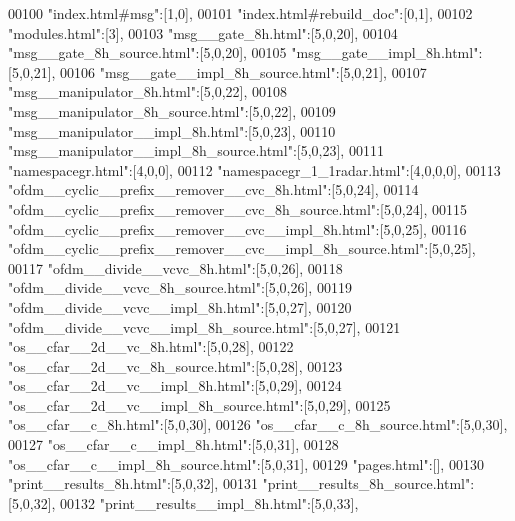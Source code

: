 \begin{DoxyCode}
00100 \textcolor{stringliteral}{"index.html#msg"}:[1,0],
00101 \textcolor{stringliteral}{"index.html#rebuild\_doc"}:[0,1],
00102 \textcolor{stringliteral}{"modules.html"}:[3],
00103 \textcolor{stringliteral}{"msg\_\_gate\_8h.html"}:[5,0,20],
00104 \textcolor{stringliteral}{"msg\_\_gate\_8h\_source.html"}:[5,0,20],
00105 \textcolor{stringliteral}{"msg\_\_gate\_\_impl\_8h.html"}:[5,0,21],
00106 \textcolor{stringliteral}{"msg\_\_gate\_\_impl\_8h\_source.html"}:[5,0,21],
00107 \textcolor{stringliteral}{"msg\_\_manipulator\_8h.html"}:[5,0,22],
00108 \textcolor{stringliteral}{"msg\_\_manipulator\_8h\_source.html"}:[5,0,22],
00109 \textcolor{stringliteral}{"msg\_\_manipulator\_\_impl\_8h.html"}:[5,0,23],
00110 \textcolor{stringliteral}{"msg\_\_manipulator\_\_impl\_8h\_source.html"}:[5,0,23],
00111 \textcolor{stringliteral}{"namespacegr.html"}:[4,0,0],
00112 \textcolor{stringliteral}{"namespacegr\_1\_1radar.html"}:[4,0,0,0],
00113 \textcolor{stringliteral}{"ofdm\_\_cyclic\_\_prefix\_\_remover\_\_cvc\_8h.html"}:[5,0,24],
00114 \textcolor{stringliteral}{"ofdm\_\_cyclic\_\_prefix\_\_remover\_\_cvc\_8h\_source.html"}:[5,0,24],
00115 \textcolor{stringliteral}{"ofdm\_\_cyclic\_\_prefix\_\_remover\_\_cvc\_\_impl\_8h.html"}:[5,0,25],
00116 \textcolor{stringliteral}{"ofdm\_\_cyclic\_\_prefix\_\_remover\_\_cvc\_\_impl\_8h\_source.html"}:[5,0,25],
00117 \textcolor{stringliteral}{"ofdm\_\_divide\_\_vcvc\_8h.html"}:[5,0,26],
00118 \textcolor{stringliteral}{"ofdm\_\_divide\_\_vcvc\_8h\_source.html"}:[5,0,26],
00119 \textcolor{stringliteral}{"ofdm\_\_divide\_\_vcvc\_\_impl\_8h.html"}:[5,0,27],
00120 \textcolor{stringliteral}{"ofdm\_\_divide\_\_vcvc\_\_impl\_8h\_source.html"}:[5,0,27],
00121 \textcolor{stringliteral}{"os\_\_cfar\_\_2d\_\_vc\_8h.html"}:[5,0,28],
00122 \textcolor{stringliteral}{"os\_\_cfar\_\_2d\_\_vc\_8h\_source.html"}:[5,0,28],
00123 \textcolor{stringliteral}{"os\_\_cfar\_\_2d\_\_vc\_\_impl\_8h.html"}:[5,0,29],
00124 \textcolor{stringliteral}{"os\_\_cfar\_\_2d\_\_vc\_\_impl\_8h\_source.html"}:[5,0,29],
00125 \textcolor{stringliteral}{"os\_\_cfar\_\_c\_8h.html"}:[5,0,30],
00126 \textcolor{stringliteral}{"os\_\_cfar\_\_c\_8h\_source.html"}:[5,0,30],
00127 \textcolor{stringliteral}{"os\_\_cfar\_\_c\_\_impl\_8h.html"}:[5,0,31],
00128 \textcolor{stringliteral}{"os\_\_cfar\_\_c\_\_impl\_8h\_source.html"}:[5,0,31],
00129 \textcolor{stringliteral}{"pages.html"}:[],
00130 \textcolor{stringliteral}{"print\_\_results\_8h.html"}:[5,0,32],
00131 \textcolor{stringliteral}{"print\_\_results\_8h\_source.html"}:[5,0,32],
00132 \textcolor{stringliteral}{"print\_\_results\_\_impl\_8h.html"}:[5,0,33],

\end{DoxyCode}
